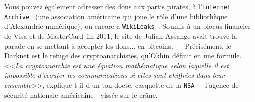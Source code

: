 \documentclass[11pt,twoside,a4paper]{article}
\begin{document}

Vous pouvez {\'e}galement adresser des dons aux partis pirates, {\`a} l'\texttt{Internet Archive~\footnotemark } (une association am{\'e}ricaine qui joue le r{\^o}le d'une biblioth{\`e}que d'Alexandrie num{\'e}rique), ou encore {\`a} \texttt{WikiLeaks~\footnotemark }. Soumis {\`a} un blocus financier de Visa et de MasterCard fin 2011, le site de Julian Assange avait trouv{\'e} la parade en se mettant {\`a} accepter les dons... en bitcoins. --- Pr{\'e}cis{\'e}ment, le Darknet est le refuge des cryptoanarchistes, qu'Okhin d{\'e}finit en une formule. <<\emph{La cryptoanarchie est une {\'e}quation math{\'e}matique selon laquelle il est impossible d'{\'e}couter les communications si elles sont chiffr{\'e}es dans leur ensemble}>>, explique-t-il d'un ton docte, casquette de la \texttt{NSA~\footnotemark } - l'agence de s{\'e}curit{\'e} nationale am{\'e}ricaine - viss{\'e}e sur le cr{\^a}ne. ~\\
\end{document}
